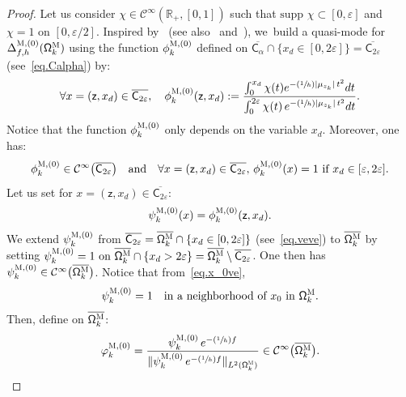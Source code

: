 \documentclass[JEP,XML,SOM,Unicode,NoEqCountersInSection,NoFloatCountersInSection,published]{cedram}
\newcommand{\Psfrac}[2]{(\sfrac{#1}{#2})}
\newcommand{\quand}{\quad\text{and}\quad}
\let\ve\varepsilon
\theoremstyle{plain}
\theoremstyle{definition}
\begin{document}
\begin{proof}
Let us consider $\chi\in\mathcal C^\infty(\mathbb R_+,[0,1])$ such that
$
\text{supp } \chi\subset [0, \ve]$ and $\chi=1 \text{ on } [0,\ve/2].
$
Inspired by~\cite{BEGK} (see also~\cite[\S4.2]{DoNe2} and~\cite{di2017small}), we~build a quasi-mode for $\Delta_{f,h}^{\textsc{M}, (0)}(\mathsf \Omega_k^{\textsc{M}})$ using the function $\phi_k^{\textsc{M},(0)}$ defined on $\overline{ \mathsf C_\alpha} \cap \{x_d \in [0,2\ve]\}= \overline {\mathsf C_{2\ve} }$ (see~\eqref{eq.Calpha}) by:
\begin{equation}\label{eq.phi=def}
\forall x = (\mathsf z,x_d) \in \overline {\mathsf C_{2\ve} }, \quad \phi^{\textsc{M},(0)}_k(\mathsf z,x_d):=\frac{ \int_0^{x_d}\chi(t)e^{-\Psfrac 1h\vert \mu_{z_k}\vert \, t^2} dt}{\int_0^{2\ve}\chi(t)\, e^{-\Psfrac 1h\vert \mu_{z_k}\vert \, t^2} dt}.
\end{equation}
Notice that the function $\phi^{\textsc{M},(0)}_k$ only depends on the variable $x_d$.
Moreover, one has:
\[
\phi^{\textsc{M},(0)}_{k}\in \mathcal C^\infty\bigl(\overline {\mathsf C_{2\ve} }\bigr) \quand 
\forall x = (\mathsf z,x_d) \in \overline {\mathsf C_{2\ve} },\, \phi^{\textsc{M},(0)}_k(x)=1 \text{ if } x_d \in [\ve,2\ve].
\]
Let us set for $x = (\mathsf z,x_d) \in \overline {\mathsf C_{2\ve}
}$:
\begin{equation}\label{eq.defPsi}
\psi^{\textsc{M},(0)}_k(x)= \phi^{\textsc{M},(0)}_k(\mathsf z,x_d).
\end{equation}
We extend $\psi^{\textsc{M},(0)}_k$ from $ \overline {\mathsf C_{2\ve} } =\overline {\mathsf \Omega_k^{\textsc{M}}}\cap \{ x_d \in [0,2\ve]\}$ (see~\eqref{eq.veve}) to $ \overline {\mathsf \Omega_k^{\textsc{M}}}$ by setting
$\psi^{\textsc{M},(0)}_k=1 \text{ on } \overline {\mathsf \Omega_k^{\textsc{M}}}\cap \{ x_d> 2\ve\}= \overline {\mathsf \Omega_k^{\textsc{M}}}\setminus \overline {\mathsf C_{2\ve} }$.
One then has $\psi^{\textsc{M},(0)}_k\in \mathcal C^\infty\bigl(\overline {\mathsf \Omega_k^{\textsc{M}}} \bigr)$.
Notice that from~\eqref{eq.x_0ve},
\begin{equation}\label{eq.psi=1x_0}
\psi^{\textsc{M},(0)}_k= 1 \quad\text{in a neighborhood of $x_0$ in $\mathsf \Omega_k^{\textsc{M}}$}.
\end{equation}
Then, define on $ \overline{\mathsf \Omega_k^{\textsc{M}}}$:
\begin{equation}\label{eq.QM-M0}
\varphi^{\textsc{M},(0)}_k=\frac{\psi^{\textsc{M},(0)}_k\, e^{-\Psfrac 1hf} }{ \Vert \psi^{\textsc{M},(0)}_k\, e^{-\Psfrac 1hf} \Vert_{L^2(\mathsf \Omega_k^{\textsc{M}})} } \in \mathcal C^\infty\bigl(\overline {\mathsf \Omega_k^{\textsc{M}}} \bigr).
\end{equation}


\end{proof}
\end{document}

